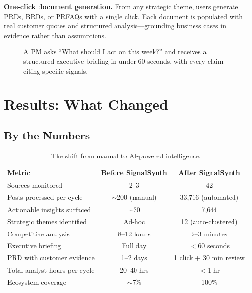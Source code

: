 \documentclass[11pt]{article}
\begin{document}
\textbf{One-click document generation.} From any strategic theme, users generate PRDs, BRDs, or PRFAQs with a single click. Each document is populated with real customer quotes and structured analysis---grounding business cases in evidence rather than assumptions.

\begin{figure}[h]
\centering
{}
\caption{A PM asks ``What should I act on this week?'' and receives a structured executive briefing in under 60 seconds, with every claim citing specific signals.}
\label{fig:askai}
\end{figure}

\section{Results: What Changed}

\subsection{By the Numbers}

\begin{table}[h]
\centering
\small
\begin{tabular}{@{}lcc@{}}
\toprule
\textbf{Metric} & \textbf{Before SignalSynth} & \textbf{After SignalSynth} \\
\midrule
Sources monitored & 2--3 & 42 \\
Posts processed per cycle & $\sim$200 (manual) & 33,716 (automated) \\
Actionable insights surfaced & $\sim$30 & 7,644 \\
Strategic themes identified & Ad-hoc & 12 (auto-clustered) \\
Competitive analysis & 8--12 hours & 2--3 minutes \\
Executive briefing & Full day & $<$60 seconds \\
PRD with customer evidence & 1--2 days & 1 click + 30 min review \\
Total analyst hours per cycle & 20--40 hrs & $<$1 hr \\
Ecosystem coverage & $\sim$7\% & 100\% \\
\bottomrule
\end{tabular}
\caption{The shift from manual to AI-powered intelligence.}
\label{tab:results}
\end{table}
\end{document}
